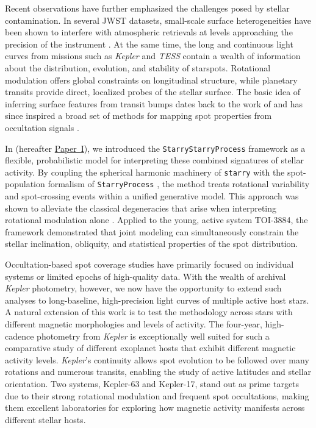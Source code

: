 \documentclass[twocolumn]{aastex631}
\newcommand{\paperone}{\hyperlink{cite.paper1}{Paper~I}}
\begin{document}
Recent observations have further emphasized the challenges posed by stellar contamination. In several JWST datasets, 
small-scale surface heterogeneities have been shown to interfere with atmospheric retrievals at levels approaching 
the precision of the instrument \citep[e.g.,][]{Lim2023}. At the same time, the long and continuous light curves 
from missions such as \textit{Kepler} \citep{Borucki2010} and \textit{TESS} contain a wealth of information about the distribution, 
evolution, and stability of starspots. Rotational modulation offers global constraints on longitudinal structure, 
while planetary transits provide direct, localized probes of the stellar surface. 
The basic idea of inferring surface features from transit bumps dates back to the work of 
\cite{Silva2003} and has since inspired a broad set of methods for mapping spot properties from occultation 
signals \citep[e.g.,][]{Huber2010, Oshagh2013, Tregloan-Reed2013, Beky2014, Montalto2014, Maxted2016, Herrero2016, Juvan2018, Scandariato2017,paper1}.

In \cite{paper1} (hereafter \paperone), we introduced the \texttt{StarryStarryProcess} framework as a flexible, 
probabilistic model for interpreting these combined signatures of stellar activity. By coupling the spherical  
harmonic machinery of \texttt{starry} \citep{Luger2019} with the spot-population formalism 
of \texttt{StarryProcess} \citep{Luger2021b}, the method treats rotational variability and 
spot-crossing events within a unified generative model. This approach was shown to alleviate the 
classical degeneracies that arise when interpreting rotational modulation alone \citep{Luger2021a}. 
Applied to the young, active system TOI-3884, the framework demonstrated that joint modeling can 
simultaneously constrain the stellar inclination, obliquity, and statistical properties of the spot distribution.

Occultation-based spot coverage studies have primarily focused on individual systems or limited
epochs of high-quality data. With the wealth of archival \textit{Kepler} photometry, however, we
now have the opportunity to extend such analyses to long-baseline, high-precision light curves
of multiple active host stars. A natural extension of this work is to test the methodology across stars 
with different magnetic morphologies and 
levels of activity. The four-year, high-cadence photometry 
from \textit{Kepler} is exceptionally well suited for such a comparative study of different exoplanet hosts
that exhibit different magnetic activity levels. \textit{Kepler}'s continuity allows spot evolution to be followed 
over many rotations and numerous transits, enabling the study of active latitudes and stellar orientation. 
Two systems, Kepler-63 and Kepler-17, stand out as prime targets 
due to their strong rotational modulation and frequent spot occultations, making them excellent laboratories 
for exploring how magnetic activity manifests across different stellar hosts.
\end{document}
